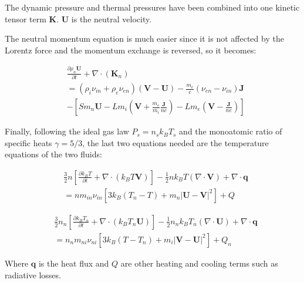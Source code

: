 \documentclass[12pt,upcase]{umlthesis}
\begin{document}
The dynamic pressure and thermal pressures have been combined into one kinetic tensor term $\textbf{K}$. $\textbf{U}$ is the neutral velocity.

The neutral momentum equation is much easier since it is not affected by the Lorentz force and the momentum exchange is reversed, so it becomes:

\begin{equation}\label{eq:momentumneutral}
\begin{aligned}
	&\frac{\partial \rho_n \textbf{U}}{\partial t} + \nabla \cdot (\textbf{K}_n) \\
	&= (\rho_i \nu_{in} + \rho_e \nu_{en})(\textbf{V} - \textbf{U}) - \frac{m_e}{e}(\nu_{en}-\nu_{in}) \textbf{J} \\
	& - [S m_n \textbf{U} - L m_i (\textbf{V} + \frac{m_e}{m_i} \frac{\textbf{J}}{n e})- L m_e (\textbf{V} -\frac{\textbf{J}}{n e})]
\end{aligned}
\end{equation}

Finally, following the ideal gas law $P_s = n_s k_B T_s$ and the monoatomic ratio of specific heats $\gamma = 5/3$, the last two equations needed are the temperature equations of the two fluids:

\begin{equation}\label{eq:temperatureion}
	\begin{aligned}
		&\frac{3}{2} n [\frac{\partial k_B T}{\partial t} + \nabla\cdot(k_B T \textbf{V})] - \frac{1}{2} n k_B T (\nabla\cdot\textbf{V}) + \nabla\cdot\textbf{q} \\
	& = n m_{in} \nu_{in} [ 3 k_B (T_n - T) + m_n \lvert \textbf{U} - \textbf{V} \rvert^2 ] + Q
	\end{aligned}
\end{equation}

\begin{equation}\label{eq:temperatureneutral}
	\begin{aligned}
		&\frac{3}{2} n_n [\frac{\partial k_B T_n}{\partial t} + \nabla\cdot(k_B T_n \textbf{U})] - \frac{1}{2} n_n k_B T_n (\nabla\cdot\textbf{U}) + \nabla\cdot\textbf{q} \\
	&= n_n m_{ni} \nu_{ni} [ 3 k_B (T - T_n) + m_i \lvert \textbf{V} - \textbf{U} \rvert^2 ] + Q_n
	\end{aligned}
\end{equation}

Where $\textbf{q}$ is the heat flux and $Q$ are other heating and cooling terms such as radiative losses.
\end{document}
